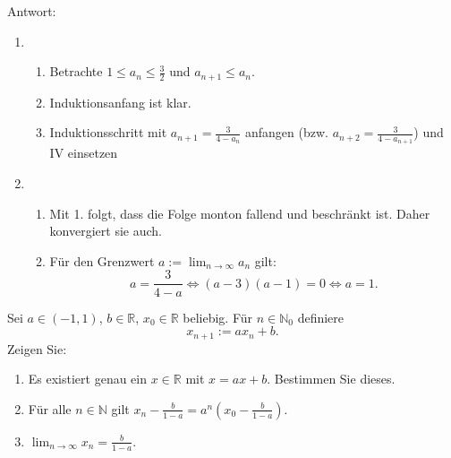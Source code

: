 \documentclass[parskip=full]{scrartcl}
\begin{document}
Antwort:
\begin{enumerate}
    \item
    \begin{enumerate}
        \item Betrachte $1 \leq a_n \leq \frac{3}{2}$ und $a_{n+1} \leq a_n$.
        \item Induktionsanfang ist klar.
        \item Induktionsschritt mit $a_{n+1} = \frac{3}{4 - a_n}$ anfangen (bzw. $a_{n+2} = \frac{3}{4 - a_{n+1}}$) und IV einsetzen
    \end{enumerate}
    \item
    \begin{enumerate}
        \item Mit 1. folgt, dass die Folge monton fallend und beschränkt ist.
        Daher konvergiert sie auch.
        \item Für den Grenzwert $a := \lim_{n \to \infty} a_n$ gilt:
        \begin{displaymath}
          a = \frac{3}{4 - a}
          \iff (a-3)(a-1) = 0
          \iff a = 1.
        \end{displaymath}
    \end{enumerate}
\end{enumerate}

Sei $a \in (-1,1)$, $b \in \mathbb{R}$, $x_0 \in \mathbb{R}$ beliebig. Für $n \in \mathbb{N}_0$ definiere
\begin{displaymath}
  x_{n+1} := ax_n + b.
\end{displaymath}
Zeigen Sie:
\begin{enumerate}
    \item Es existiert genau ein $x \in \mathbb{R}$ mit $x = ax+b$. Bestimmen Sie dieses.
    \item Für alle $n \in \mathbb{N}$ gilt $x_n - \frac{b}{1-a} = a^n\left(x_0 - \frac{b}{1-a}\right)$.
    \item $\lim_{n \to \infty} x_n = \frac{b}{1-a}$.
\end{enumerate}
\end{document}
